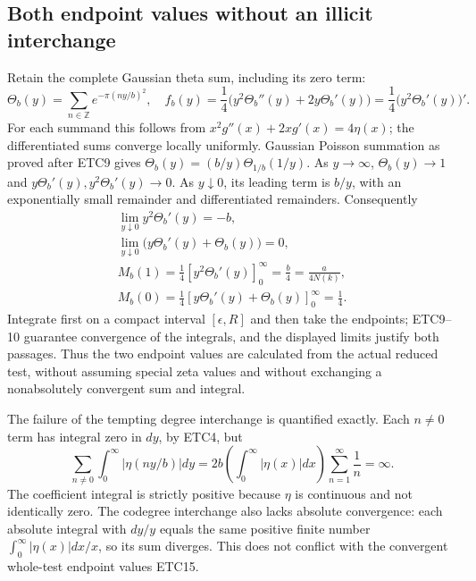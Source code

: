 \documentclass[11pt]{article}
\begin{document}
\subsection{Both endpoint values without an illicit interchange}

Retain the complete Gaussian theta sum, including its zero term:
\begin{equation}\tag{ETC14}
 \Theta_b(y)=\sum_{n\in\mathbb Z}e^{-\pi(ny/b)^2},\quad
 f_b(y)=\frac14\bigl(y^2\Theta_b''(y)+2y\Theta_b'(y)\bigr)
       =\frac14\bigl(y^2\Theta_b'(y)\bigr)'.
\end{equation}
For each summand this follows from
$x^2g''(x)+2xg'(x)=4\eta(x)$; the differentiated sums converge
locally uniformly. Gaussian Poisson summation as proved after ETC9
gives
$\Theta_b(y)=(b/y)\Theta_{1/b}(1/y)$.
As $y\to\infty$, $\Theta_b(y)\to1$ and
$y\Theta_b'(y),y^2\Theta_b'(y)\to0$.
As $y\downarrow0$, its leading term is $b/y$, with an
exponentially small remainder and differentiated remainders.
Consequently
\begin{equation}\tag{ETC15}
 \begin{gathered}
 \lim_{y\downarrow0}y^2\Theta_b'(y)=-b,\\
 \lim_{y\downarrow0}\bigl(y\Theta_b'(y)+\Theta_b(y)\bigr)=0,\\
 M_b(1)=\frac14[y^2\Theta_b'(y)]_{0}^{\infty}
       =\frac b4=\frac{a}{4N(k)},\\
 M_b(0)=\frac14[y\Theta_b'(y)+\Theta_b(y)]_{0}^{\infty}
       =\frac14.
 \end{gathered}
\end{equation}
Integrate first on a compact interval $[\epsilon,R]$ and then
take the endpoints; ETC9--10 guarantee convergence of the integrals,
and the displayed limits justify both passages. Thus the two endpoint
values are calculated from the actual reduced test, without assuming
special zeta values and without exchanging a nonabsolutely convergent
sum and integral.

The failure of the tempting degree interchange is quantified exactly.
Each $n\ne0$ term has integral zero in $dy$, by ETC4, but
\begin{equation}\tag{ETC16}
 \sum_{n\ne0}\int_0^\infty|\eta(ny/b)|dy
 =2b\left(\int_0^\infty|\eta(x)|dx\right)
                         \sum_{n=1}^\infty\frac1n=\infty.
\end{equation}
The coefficient integral is strictly positive because $\eta$ is
continuous and not identically zero. The codegree interchange also
lacks absolute convergence: each absolute integral with $dy/y$
equals the same positive finite number
$\int_0^\infty|\eta(x)|dx/x$, so its sum diverges. This does not
conflict with the convergent whole-test endpoint values ETC15.
\end{document}
